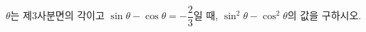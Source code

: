 $\theta$는 제3사분면의 각이고 $\sin\theta-\cos\theta=-\dfrac{2}{3}$일 때, $\sin^{2}\theta-\cos^{2}\theta$의 값을 구하시오.
